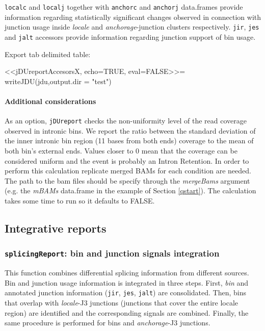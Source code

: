 \documentclass{article}
\begin{document}
\texttt{localc} and \texttt{localj} together with \texttt{anchorc} and \texttt{anchorj} data.frames provide information regarding statistically significant changes observed in connection with junction usage inside {\em locale} and {\em anchorage}-junction clusters respectively. \texttt{jir}, \texttt{jes} and \texttt{jalt} accessors provide information regarding junction support of bin usage.

Export tab delimited table:

 <<jDUreportAccesorsX, echo=TRUE, eval=FALSE>>=
writeJDU(jdu,output.dir = "test")

\paragraph{Additional considerations}

As an option, \texttt{jDUreport} checks the non-uniformity level of the read coverage observed in intronic bins. We report the ratio between the standard deviation of the inner intronic bin region (11 bases from both ends) coverage to the mean of both bin's external ends. Values closer to 0 mean that the coverage can be considered uniform and the event is probably an Intron Retention. In order to perform this calculation  replicate merged BAMs for each condition are needed. The path to the bam files should be specify through the {\em mergeBams} argument (e.g. the {\em mBAMs} data.frame in the example of Section \ref{qstart}). 
The calculation takes some time to run so it defaults to FALSE.



\subsection{Integrative reports} \label{sec:integration}

\subsubsection{\texttt{splicingReport}: bin and junction signals integration}

This function combines differential splicing information from different sources. Bin and junction usage information is integrated in three steps. First, {\em bin} and annotated junction information (\texttt{jir}, \texttt{jes}, \texttt{jalt}) are consolidated. Then, bins that overlap with {\em locale}-J3 junctions (junctions that cover the entire locale region) are identified and the corresponding signals are combined. Finally, the same procedure is performed for bins and {\em anchorage}-J3 junctions.
\end{document}
